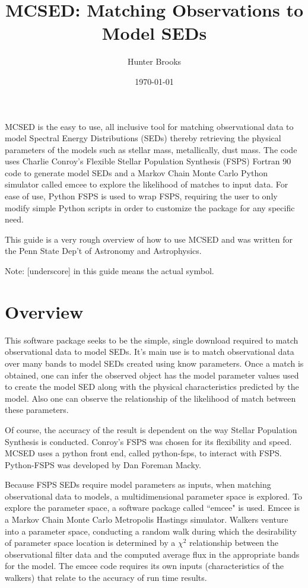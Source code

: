 \documentclass[12pt,a4paper]{article}
\title{MCSED: Matching Observations to Model SEDs}
\author{Hunter Brooks}
\date{\today}
\begin{document}
\maketitle

\section*{}
MCSED is the easy to use, all inclusive tool for matching observational data to model Spectral Energy Distributions (SEDs) thereby retrieving the physical parameters of the models such as stellar mass, metallically, dust mass.  The code uses Charlie Conroy's Flexible Stellar Population Synthesis (FSPS) Fortran 90 code to generate model SEDs and a Markov Chain Monte Carlo Python simulator called emcee to explore the likelihood of matches to input data.  For ease of use, Python FSPS is used to wrap FSPS, requiring the user to only modify simple Python scripts in order to customize the package for any specific need.  

This guide is a very rough overview of how to use MCSED and was written for the Penn State Dep't of Astronomy and Astrophysics.  

Note: [underscore] in this guide means the actual symbol.  
\newpage
 
 

\section{Overview}

This software package seeks to be the simple, single download required to match observational data to model SEDs.  It's main use is to match observational data over many bands to model SEDs created using know parameters.  Once a match is obtained, one can infer the observed object has the model parameter values used to create the model SED along with the physical characteristics predicted by the model.  Also one can observe the relationship of the likelihood of match between these parameters.  

Of course, the accuracy of the result is dependent on the way Stellar Population Synthesis is conducted. Conroy's FSPS was chosen for its flexibility and speed.  MCSED uses a python front end, called python-fsps, to interact with FSPS.   Python-FSPS was developed by Dan Foreman Macky.  

Because FSPS SEDs require model parameters as inputs, when matching observational data to models, a multidimensional parameter space is explored.  To explore the parameter space, a software package called ``emcee" is used.  Emcee is a Markov Chain Monte Carlo Metropolis Hastings simulator.  Walkers venture into a parameter space, conducting a random walk during which the desirability of parameter space location is determined by a $\chi^2$ relationship between the observational filter data and the computed average flux in the appropriate bands for the model.  The emcee code requires its own inputs (characteristics of the walkers) that relate to the accuracy of run time results.  
\end{document}
